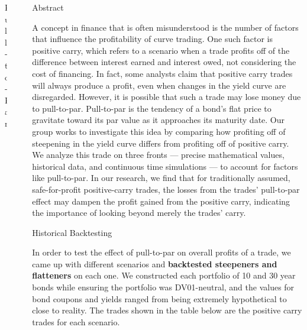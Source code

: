 \documentclass[final]{beamer}
\newlength{\sepwidth}
\newlength{\colwidth}
\newcommand{\separatorcolumn}{\begin{column}{\sepwidth}\end{column}}
\begin{document}
\begin{frame}[t]
\begin{columns}[t]
\begin{column}{\colwidth}
\begin{block}{Pull-to-Par}
  \end{block}

\end{column}

\separatorcolumn

\begin{column}{\colwidth}
\begin{alertblock}{Abstract}

    A concept in finance that is often misunderstood is the number of factors that influence the profitability of curve trading. One such factor is positive carry, which refers to a scenario when a trade profits off of the difference between interest earned and interest owed, not considering the cost of financing. In fact, some analysts claim that positive carry trades will always produce a profit, even when changes in the yield curve are disregarded. However, it is possible that such a trade may lose money due to pull-to-par. Pull-to-par is the tendency of a bond’s flat price to gravitate toward its par value as it approaches its maturity date. Our group works to investigate this idea by comparing how profiting off of steepening in the yield curve differs from profiting off of positive carry. We analyze this trade on three fronts — precise mathematical values, historical data, and continuous time simulations — to account for factors like pull-to-par. In our research, we find that for traditionally assumed, safe-for-profit positive-carry trades, the losses from the trades' pull-to-par effect may dampen the profit gained from the positive carry, indicating the importance of looking beyond merely the trades' carry. 

  \end{alertblock}

\begin{block}{Historical Backtesting}

In order to test the effect of pull-to-par on overall profits of a trade, we came up with different scenarios and \textbf{backtested steepeners and flatteners} on each one. We constructed each portfolio of 10 and 30 year bonds while ensuring the portfolio was DV01-neutral, and the values for bond coupons and yields ranged from being extremely hypothetical to close to reality. The trades shown in the table below are the positive carry trades for each scenario.


\end{block}
\end{column}
\end{columns}
\end{frame}
\end{document}

